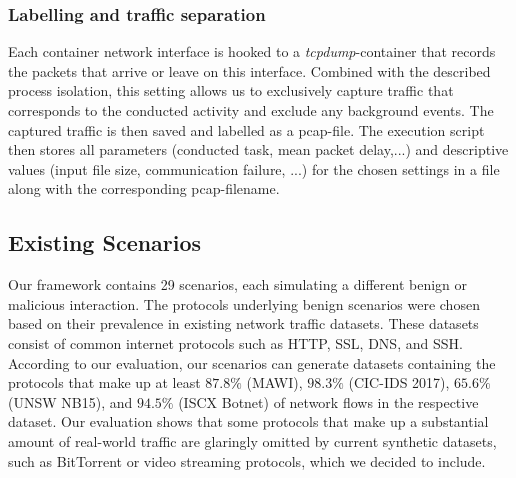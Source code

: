 \documentclass[runningheads]{llncs}
\begin{document}
\subsubsection*{Labelling and traffic separation}

Each container network interface is hooked to a \emph{tcpdump}-container that records the packets that arrive or leave on this interface. Combined with the described process isolation, this setting allows us to exclusively capture traffic that corresponds to the conducted activity and exclude any background events. The captured traffic is then saved and labelled as a pcap-file. The execution script then stores all parameters (conducted task, mean packet delay,...) and descriptive values (input file size, communication failure, ...) for the chosen settings in a file along with the corresponding pcap-filename.




\subsection{Existing Scenarios}\label{Sec:ExistScen}

Our framework contains 29 scenarios, each simulating a different benign or malicious interaction. The protocols underlying benign scenarios were chosen based on their prevalence in existing network traffic datasets.%
These datasets consist of common internet protocols such as HTTP, SSL, DNS, and SSH. According to our evaluation, our scenarios can generate datasets containing the protocols that make up at least $87.8\%$ (MAWI), $98.3\%$ (CIC-IDS 2017), $65.6\%$ (UNSW NB15), and $94.5\%$ (ISCX Botnet) of network flows in the respective dataset.
Our evaluation shows that some protocols that make up a substantial amount of real-world traffic are glaringly omitted by current synthetic datasets, such as BitTorrent or video streaming protocols, which we decided to include. 
\end{document}
